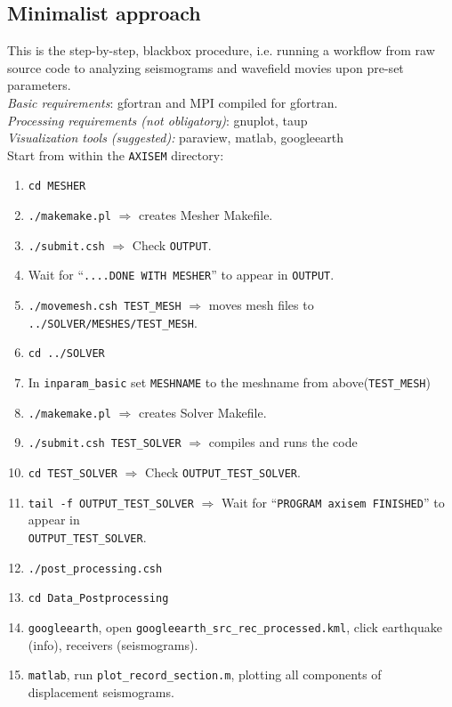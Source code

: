 \documentclass[11pt,letter,fleqn,english,notitlepage]{article}
\begin{document}
\subsection{Minimalist approach}
This is the step-by-step, blackbox procedure, i.e. running a workflow from raw source code to analyzing 
seismograms and wavefield movies upon pre-set parameters.\\

\noindent \textit{Basic requirements}: gfortran and MPI compiled for gfortran.\\
\textit{Processing requirements (not obligatory)}: gnuplot, taup\\
\textit{Visualization tools (suggested):} paraview, matlab, googleearth\\

\noindent Start from within the {\tt AXISEM} directory:
\begin{enumerate}
\item {\tt cd MESHER}
\item {\tt ./makemake.pl} $\Rightarrow$ creates Mesher Makefile.
\item {\tt ./submit.csh} $\Rightarrow$ Check {\tt OUTPUT}.
\item Wait for ``{\tt ....DONE WITH MESHER}'' to appear in {\tt OUTPUT}.
\item {\tt ./movemesh.csh TEST\_MESH} $\Rightarrow$ moves mesh files to {\tt ../SOLVER/MESHES/TEST\_MESH}.
\item {\tt cd ../SOLVER}
\item In \verb|inparam_basic| set \verb|MESHNAME| to the meshname from above(\verb|TEST_MESH|)
\item {\tt ./makemake.pl} $\Rightarrow$ creates Solver Makefile.
\item {\tt ./submit.csh TEST\_SOLVER}  $\Rightarrow$ compiles and runs the code
\item {\tt cd TEST\_SOLVER} $\Rightarrow$ Check {\tt OUTPUT\_TEST\_SOLVER}.
\item \verb|tail -f OUTPUT_TEST_SOLVER| $\Rightarrow$ Wait for ``{\tt  PROGRAM
        axisem FINISHED}'' to appear in \\ {\tt OUTPUT\_TEST\_SOLVER}.
\item {\tt ./post\_processing.csh}
\item {\tt cd Data\_Postprocessing} 
\item {\tt googleearth}, open {\tt googleearth\_src\_rec\_processed.kml}, click
        earthquake (info), receivers (seismograms).
\item {\tt matlab}, run {\tt plot\_record\_section.m}, plotting all components
        of displacement seismograms.

\end{enumerate}
\end{document}
